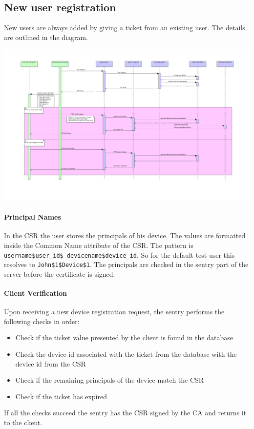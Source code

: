 \documentclass[12pt]{report}
\begin{document}
\subsection{New user registration}

New users are always added by giving a ticket from an existing user. The details are outlined in the diagram. 

\includegraphics[width=\linewidth]{diagrams/new-user-registration.png}

\paragraph{Principal Names}
In the CSR the user stores the principals of his device. The values are formatted inside the Common Name attribute of the CSR. The pattern is \texttt{username\$user\_id\$ devicename\$device\_id}. So for the default test user this resolves to \texttt{John\$1\$Device\$1}. 
The principals are checked in the sentry part of the server before the certificate is signed. 

\paragraph{Client Verification}
Upon receiving a new device registration request, the sentry performs the following checks in order:
\begin{itemize}
\item Check if the ticket value presented by the client is found in the database
\item Check the device id associated with the ticket from the database with the device id from the CSR
\item Check if the remaining principals of the device match the CSR
\item Check if the ticket has expired
\end{itemize}
If all the checks succeed the sentry has the CSR signed by the CA and returns it to the client. 
\end{document}
